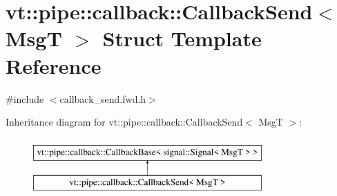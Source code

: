 \hypertarget{structvt_1_1pipe_1_1callback_1_1_callback_send}{}\section{vt\+:\+:pipe\+:\+:callback\+:\+:Callback\+Send$<$ MsgT $>$ Struct Template Reference}
\label{structvt_1_1pipe_1_1callback_1_1_callback_send}


{\ttfamily \#include $<$callback\+\_\+send.\+fwd.\+h$>$}

Inheritance diagram for vt\+:\+:pipe\+:\+:callback\+:\+:Callback\+Send$<$ MsgT $>$\+:\begin{figure}[H]
\begin{center}
\leavevmode
\includegraphics[height=2.000000cm]{structvt_1_1pipe_1_1callback_1_1_callback_send}
\end{center}
\end{figure}
